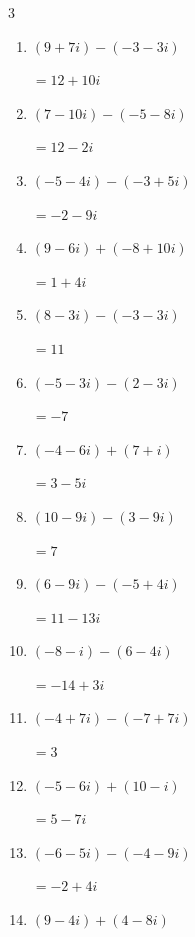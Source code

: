 \begin{multicols}{3}
\begin{enumerate}
        $\displaystyle =-20+6i$

  \item $\displaystyle (9+7i) - (-3-3i)$

        $\displaystyle =12+10i$

  \item $\displaystyle (7-10i) - (-5-8i)$

        $\displaystyle =12-2i$

  \item $\displaystyle (-5-4i) - (-3+5i)$

        $\displaystyle =-2-9i$

  \item $\displaystyle (9-6i) + (-8+10i)$

        $\displaystyle =1+4i$

  \item $\displaystyle (8-3i) - (-3-3i)$

        $\displaystyle =11$

  \item $\displaystyle (-5-3i) - (2-3i)$

        $\displaystyle =-7$

  \item $\displaystyle (-4-6i) + (7+i)$

        $\displaystyle =3-5i$

  \item $\displaystyle (10-9i) - (3-9i)$

        $\displaystyle =7$

  \item $\displaystyle (6-9i) - (-5+4i)$

        $\displaystyle =11-13i$

  \item $\displaystyle (-8-i) - (6-4i)$

        $\displaystyle =-14+3i$

  \item $\displaystyle (-4+7i) - (-7+7i)$

        $\displaystyle =3$

  \item $\displaystyle (-5-6i) + (10-i)$

        $\displaystyle =5-7i$

  \item $\displaystyle (-6-5i) - (-4-9i)$

        $\displaystyle =-2+4i$

  \item $\displaystyle (9-4i) + (4-8i)$


\end{enumerate}
\end{multicols}
